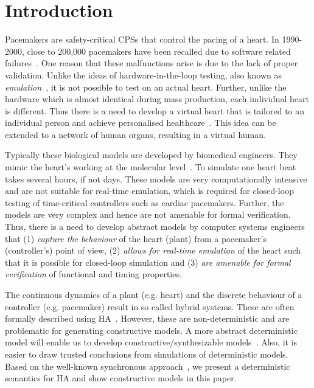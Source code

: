 \section{Introduction}

Pacemakers are safety-critical \acp{CPS} 
that control the pacing of a heart.
In 1990-2000, close to 200,000 pacemakers have been recalled
due to software related failures~\cite{alemzadeh13}.
 One reason that these malfunctions
arise is due to the lack of proper validation.
Unlike the ideas of hardware-in-the-loop testing,
also known as \emph {emulation}~\cite{patel2015survey},
it is not possible to test on an actual heart.
Further, unlike the hardware which is almost identical 
during mass production, each individual heart is different.
Thus there is a need to develop a virtual heart that is tailored
to an individual person and achieve
personalised healthcare~\cite{Trayanova2014}. 
This idea can be extended 
to a network of human organs, resulting in a virtual human.

Typically these biological  models are  developed by biomedical engineers.
They mimic the heart's working at the
molecular level~\cite{Trayanova2014}. 
To simulate one heart beat takes several hours, if not days.
These models are very computationally intensive and 
are not suitable for real-time emulation,
which is required for closed-loop testing of time-critical 
controllers such as cardiac pacemakers.
Further, the models are 
 very complex and hence 
 are not amenable for  formal verification. 
Thus, there is a need to develop abstract models 
by computer systems engineers that  
(1)  \emph{capture the behaviour} of the heart (plant) 
from a pacemaker's (controller's) point of view,
(2) \emph{allows for real-time emulation} of the heart 
such that it is possible for closed-loop simulation and
(3) \emph{are amenable for formal verification} of 
functional and timing properties.


The continuous dynamics of a plant (e.g. heart) and
 the discrete behaviour of a controller (e.g. pacemaker) 
 result in so called hybrid systems. 
 These are often formally described using \acf{HA}~\cite{alur2015principles,raskin05,chen201487}.
 However, these are non-deterministic and are problematic
 for generating constructive models.
 A more abstract deterministic model will enable us to
 develop constructive/synthesizable models~\cite{Lee2014}. Also, 
 it is easier to draw trusted conclusions from simulations
 of deterministic models. Based on the
 well-known synchronous approach~\cite{benveniste03}, 
 we present a deterministic semantics for \ac{HA} and show
 constructive models in this paper.


